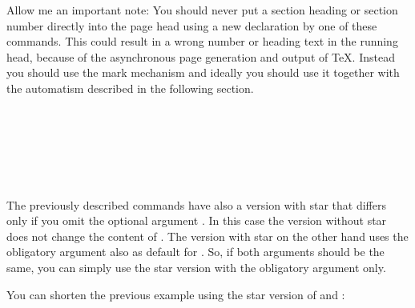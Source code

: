Allow me an important note: You should never put a
section heading or section number directly into the page head using a new
declaration by one of these commands. This could result in a wrong number or
heading text in the running head, because of the asynchronous page generation
and output of \TeX. Instead you should use the mark mechanism and ideally you
should use it together with the automatism described in the following
section.%
%
%
%
%
%
%


\begin{Declaration}
                \\
                \\
                \\
                \\
                \\
\end{Declaration}
%
%
%
%
%
%
The previously described commands have also a version with
star that differs only if you
omit the optional argument . In this case
the version without star does not change the content of
. The version with star on the other hand uses
the obligatory argument  also as default for
. So, if both arguments should be the same, you
can simply use the star version with the obligatory argument only.%

\begin{Example}
  You can shorten the previous example using the star version of
   and :
\end{Example}

